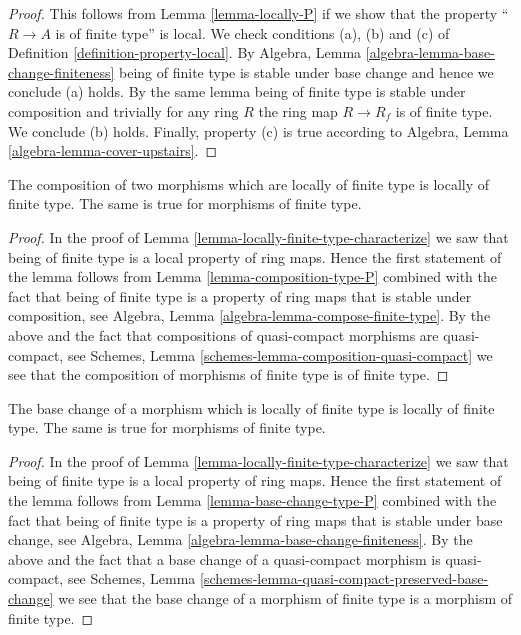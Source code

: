 \begin{proof}
This follows from Lemma \ref{lemma-locally-P} if we show that
the property ``$R \to A$ is of finite type'' is local.
We check conditions (a), (b) and (c) of Definition
\ref{definition-property-local}.
By Algebra, Lemma \ref{algebra-lemma-base-change-finiteness}
being of finite type is stable under base change and hence
we conclude (a) holds. By the same lemma being of finite type
is stable under composition and trivially for any ring
$R$ the ring map $R \to R_f$ is of finite type.
We conclude (b) holds. Finally, property (c) is true
according to Algebra, Lemma \ref{algebra-lemma-cover-upstairs}.
\end{proof}

\begin{lemma}
\label{lemma-composition-finite-type}
The composition of two morphisms which are locally of finite type is
locally of finite type. The same is true for morphisms of finite type.
\end{lemma}

\begin{proof}
In the proof of Lemma \ref{lemma-locally-finite-type-characterize}
we saw that being of finite type is a local property of ring maps.
Hence the first statement of the lemma follows from
Lemma \ref{lemma-composition-type-P} combined
with the fact that being of finite type is a property of ring maps that is
stable under composition, see
Algebra, Lemma \ref{algebra-lemma-compose-finite-type}.
By the above and the fact that compositions of
quasi-compact morphisms are quasi-compact, see
Schemes, Lemma \ref{schemes-lemma-composition-quasi-compact}
we see that the composition of morphisms of finite type is
of finite type.
\end{proof}

\begin{lemma}
\label{lemma-base-change-finite-type}
The base change of a morphism which is locally of finite type
is locally of finite type. The same is true for morphisms of
finite type.
\end{lemma}

\begin{proof}
In the proof of Lemma \ref{lemma-locally-finite-type-characterize}
we saw that being of finite type is a local property of ring maps.
Hence the first statement of the lemma follows from
Lemma \ref{lemma-base-change-type-P} combined
with the fact that being of finite type is a property of ring maps that is
stable under base change, see
Algebra, Lemma \ref{algebra-lemma-base-change-finiteness}.
By the above and the fact that a base change of a
quasi-compact morphism is quasi-compact, see
Schemes, Lemma \ref{schemes-lemma-quasi-compact-preserved-base-change}
we see that the base change of a morphism of finite type is
a morphism of finite type.
\end{proof}

